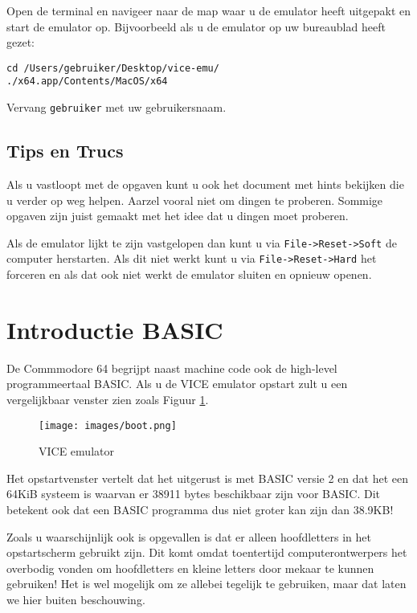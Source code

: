 \documentclass{article}
\begin{document}
Open de terminal en navigeer naar de map waar u de emulator heeft uitgepakt en start de emulator op. Bijvoorbeeld als u de emulator op uw bureaublad heeft gezet:
\begin{lstlisting}
cd /Users/gebruiker/Desktop/vice-emu/
./x64.app/Contents/MacOS/x64
\end{lstlisting}

Vervang \verb:gebruiker: met uw gebruikersnaam.

\subsection{Tips en Trucs}

Als u vastloopt met de opgaven kunt u ook het document met hints bekijken die u verder op weg helpen.
Aarzel vooral niet om dingen te proberen.
Sommige opgaven zijn juist gemaakt met het idee dat u dingen moet proberen.

Als de emulator lijkt te zijn vastgelopen dan kunt u via \verb:File->Reset->Soft: de computer herstarten.
Als dit niet werkt kunt u via \verb:File->Reset->Hard: het forceren en als dat ook niet werkt de emulator sluiten en opnieuw openen.

\section{Introductie BASIC}

De Commmodore 64 begrijpt naast machine code ook de high-level programmeertaal BASIC.
Als u de VICE emulator opstart zult u een vergelijkbaar venster zien zoals Figuur \ref{fig:vice}.

\begin{figure}
\centering
\texttt{[image: images/boot.png]}
\caption{VICE emulator}
\label{fig:vice}
\end{figure}

Het opstartvenster vertelt dat het uitgerust is met BASIC versie 2 en dat het een 64KiB systeem is waarvan er 38911 bytes beschikbaar zijn voor BASIC.
Dit betekent ook dat een BASIC programma dus niet groter kan zijn dan 38.9KB!

Zoals u waarschijnlijk ook is opgevallen is dat er alleen hoofdletters in het opstartscherm gebruikt zijn.
Dit komt omdat toentertijd computerontwerpers het overbodig vonden om hoofdletters en kleine letters door mekaar te kunnen gebruiken!
Het is wel mogelijk om ze allebei tegelijk te gebruiken, maar dat laten we hier buiten beschouwing.
\end{document}
